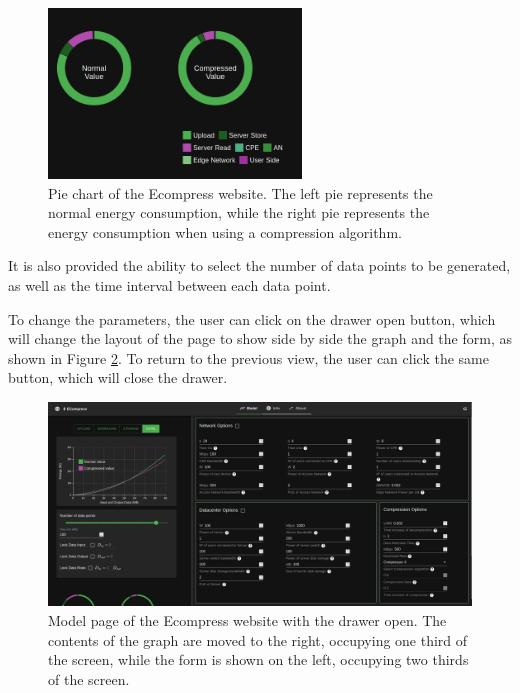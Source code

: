         \begin{figure}[H]
            \centering
            \includegraphics[width=0.6\textwidth]{figs/web_model_piechart.png}
            \caption[Pie chart of the Ecompress website.] {Pie chart of the Ecompress website. The left pie represents the normal energy consumption, while the right pie represents the energy consumption when using a compression algorithm.}
            \label{fig:web_model_piechart}
        \end{figure}

        It is also provided the ability to select the number of data points to be generated, as well as the time interval between each data point.

        To change the parameters, the user can click on the drawer open button, which will change the layout of the page to show side by side the graph and the form, as shown in Figure \ref{fig:web_calculator_drawer_open}. To return to the previous view, the user can click the same button, which will close the drawer.

        \begin{figure}[H]
            \centering
            \includegraphics[width=1\textwidth]{figs/web_model_page_open.png}
            \caption[Model page of the Ecompress website with the drawer open.]{Model page of the Ecompress website with the drawer open. The contents of the graph are moved to the right, occupying one third of the screen, while the form is shown on the left, occupying two thirds of the screen.}
            \label{fig:web_calculator_drawer_open}
        \end{figure}

